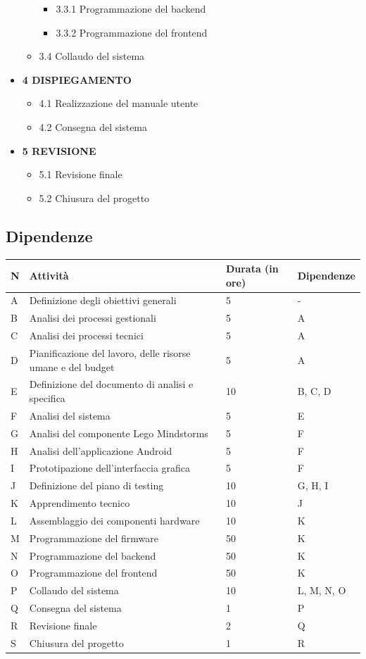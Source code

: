 \documentclass{article}
\begin{document}
\begin{itemize}
\begin{itemize}
\begin{itemize}
\item
3.3.1 Programmazione del backend
\item
3.3.2 Programmazione del frontend
\end{itemize}
\item
3.4 Collaudo del sistema
\end{itemize}
\item
\textbf{4 DISPIEGAMENTO}

\begin{itemize}
\item
4.1 Realizzazione del manuale utente
\item
4.2 Consegna del sistema
\end{itemize}
\item
\textbf{5 REVISIONE}

\begin{itemize}
\item
5.1 Revisione finale
\item
5.2 Chiusura del progetto
\end{itemize}
\end{itemize}


\subsection{Dipendenze}

\begin{longtable}[]{@{}llll@{}}
\toprule
N & Attività & Durata (in ore) & Dipendenze\tabularnewline
\midrule
\endhead
A & Definizione degli obiettivi generali & 5 & -\tabularnewline
B & Analisi dei processi gestionali & 5 & A\tabularnewline
C & Analisi dei processi tecnici & 5 & A\tabularnewline
D & Pianificazione del lavoro, delle risorse umane e del budget & 5 &
A\tabularnewline
E & Definizione del documento di analisi e specifica & 10 & B, C,
D\tabularnewline
F & Analisi del sistema & 5 & E\tabularnewline
G & Analisi del componente Lego Mindstorms & 5 & F\tabularnewline
H & Analisi dell'applicazione Android & 5 & F\tabularnewline
I & Prototipazione dell'interfaccia grafica & 5 & F\tabularnewline
J & Definizione del piano di testing & 10 & G, H, I\tabularnewline
K & Apprendimento tecnico & 10 & J\tabularnewline
L & Assemblaggio dei componenti hardware & 10 & K\tabularnewline
M & Programmazione del firmware & 50 & K\tabularnewline
N & Programmazione del backend & 50 & K\tabularnewline
O & Programmazione del frontend & 50 & K\tabularnewline
P & Collaudo del sistema & 10 & L, M, N, O\tabularnewline
Q & Consegna del sistema & 1 & P\tabularnewline
R & Revisione finale & 2 & Q\tabularnewline
S & Chiusura del progetto & 1 & R\tabularnewline
\bottomrule
\end{longtable}
\end{document}
